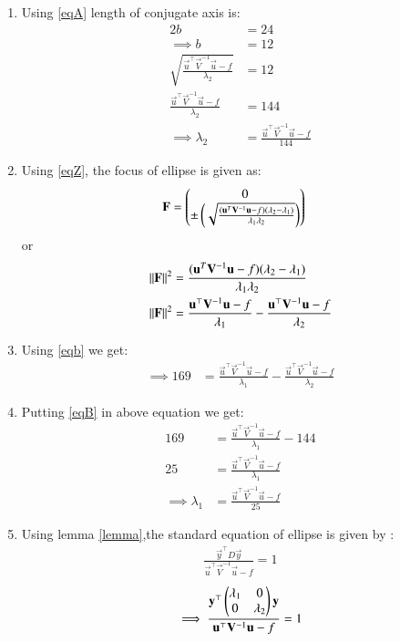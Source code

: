 \documentclass[journal,12pt,twocolumn]{IEEEtran}
\begin{document}
\begin{enumerate}
\item Using \eqref{eqA} length of conjugate axis is:
\begin{align}
2b &= 24
\\
\implies b  &= 12
\\
 \sqrt{\frac{\vec{u}^{\top}\vec{V}^{-1}\vec{u}-f}{\lambda_2}} &= 12
\\
 \frac{\vec{u}^{\top}\vec{V}^{-1}\vec{u}-f}{\lambda_2} &= 144 \label{eqB}
\\
\implies \lambda_2&=\frac{\vec{u}^{\top}\vec{V}^{-1}\vec{u}-f}{144}\label{eqC} 
\end{align}
\item Using \eqref{eqZ}, the focus of ellipse is given as:
\begin{align}
 \mathbf{F} &= \begin{pmatrix}0\\\pm \left(\sqrt{\frac{(\mathbf{u}^T\mathbf{V}^{-1}\mathbf{u}-f)(\lambda_2-\lambda_1)}{\lambda_1\lambda_2}}\right)\end{pmatrix}
 \end{align}
 or
 \begin{align}
\lVert\mathbf{F}\rVert^2 &= \frac{(\mathbf{u}^T\mathbf{V}^{-1}\mathbf{u}-f)(\lambda_2-\lambda_1)}{\lambda_1\lambda_2}
 \\
\lVert\mathbf{F}\rVert^2 &= \frac{\mathbf{u}^{\top}\mathbf{V}^{-1}\mathbf{u}-f}{\lambda_1}-\frac{\mathbf{u}^{\top}\mathbf{V}^{-1}\mathbf{u}-f}{\lambda_2}
 \end{align}
 \item Using \eqref{eqb} we get:
 \begin{align}
\implies 169 &= \frac{\vec{u}^{\top}\vec{V}^{-1}\vec{u}-f}{\lambda_1}-\frac{\vec{u}^{\top}\vec{V}^{-1}\vec{u}-f}{\lambda_2}
\end{align}
\item Putting \eqref{eqB} in above equation we get:
\begin{align}
    169 &= \frac{\vec{u}^{\top}\vec{V}^{-1}\vec{u}-f}{\lambda_1}-144
    \\
    25 &= \frac{\vec{u}^{\top}\vec{V}^{-1}\vec{u}-f}{\lambda_1}
    \\
     \implies\lambda_1&=\frac{\vec{u}^{\top}\vec{V}^{-1}\vec{u}-f}{25} \label{eqD}
\end{align}
\item Using lemma \eqref{lemma},the standard equation of ellipse is given by :
\begin{align}
\frac{\vec{y}^{\top}D\vec{y}}{\vec{u}^{\top}\vec{V}^{-1}\vec{u}-f}=1
\end{align}
\begin{align}
\implies \frac{\vec{y}^{\top}\myvec{\lambda_1& 0 \\ 0 & \lambda_2}\vec{y} }{\vec{u}^{\top}\vec{V}^{-1}\vec{u}-f}=1

\end{align}
\end{enumerate}
\end{document}
